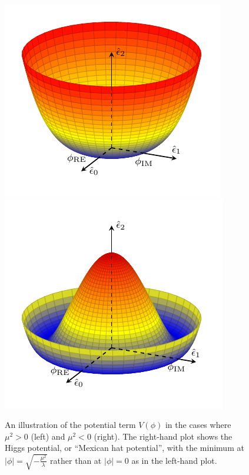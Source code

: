 \begin{figure}[htbp]
  \centering
  \includegraphics[width=.48\textwidth]{figs/theory/higgspotential_greater0}
  \includegraphics[width=.48\textwidth]{figs/theory/higgspotential}
  \caption{An illustration of the potential term $V(\phi)$ in the cases where $\mu^2 > 0$ (left) and $\mu^2 < 0$ (right).  The right-hand plot shows the Higgs potential, or ``Mexican hat potential'', with the minimum at $|\phi| = \sqrt{-\frac{\mu^2}{\lambda}}$ rather than at $|\phi| = 0$ as in the left-hand plot.}
  \label{fig:mexican_hat}
\end{figure}

